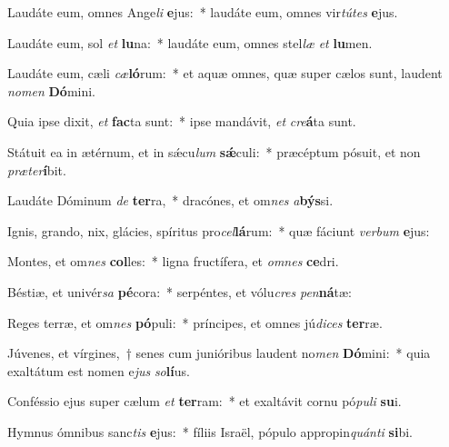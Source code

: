 \item Laudáte eum, omnes Ange\textit{li} \textbf{e}jus:~* laudáte eum, omnes vir\textit{tú}\textit{tes} \textbf{e}jus.
\item Laudáte eum, sol \textit{et} \textbf{lu}na:~* laudáte eum, omnes stel\textit{læ} \textit{et} \textbf{lu}men.
\item Laudáte eum, cæli \textit{cæ}\textbf{ló}rum:~* et aquæ omnes, quæ super cælos sunt, laudent \textit{no}\textit{men} \textbf{Dó}mini.
\item Quia ipse dixit, \textit{et} \textbf{fac}ta sunt:~* ipse mandávit, \textit{et} \textit{cre}\textbf{á}ta sunt.
\item Státuit ea in ætérnum, et in sǽcu\textit{lum} \textbf{sǽ}culi:~* præcéptum pósuit, et non \textit{præ}\textit{ter}\textbf{í}bit.
\item Laudáte Dóminum \textit{de} \textbf{ter}ra,~* dracónes, et om\textit{nes} \textit{a}\textbf{býs}si.
\item Ignis, grando, nix, glácies, spíritus pro\textit{cel}\textbf{lá}rum:~* quæ fáciunt \textit{ver}\textit{bum} \textbf{e}jus:
\item Montes, et om\textit{nes} \textbf{col}les:~* ligna fructífera, et \textit{om}\textit{nes} \textbf{ce}dri.
\item Béstiæ, et univér\textit{sa} \textbf{pé}cora:~* serpéntes, et vólu\textit{cres} \textit{pen}\textbf{ná}tæ:
\item Reges terræ, et om\textit{nes} \textbf{pó}puli:~* príncipes, et omnes jú\textit{di}\textit{ces} \textbf{ter}ræ.
\item Júvenes, et vírgines,~† senes cum junióribus laudent no\textit{men} \textbf{Dó}mini:~* quia exaltátum est nomen e\textit{jus} \textit{so}\textbf{lí}us.
\item Conféssio ejus super cælum \textit{et} \textbf{ter}ram:~* et exaltávit cornu pó\textit{pu}\textit{li} \textbf{su}i.
\item Hymnus ómnibus sanc\textit{tis} \textbf{e}jus:~* fíliis Israël, pópulo appropin\textit{quán}\textit{ti} \textbf{si}bi.
